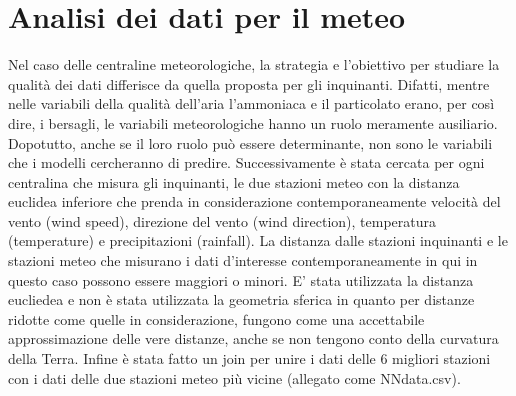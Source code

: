 \documentclass{article}
\begin{document}
\section{Analisi dei dati per il meteo}
Nel caso delle centraline meteorologiche, la strategia e l’obiettivo per studiare la qualità dei dati differisce da quella proposta 
per gli inquinanti. 
Difatti, mentre nelle variabili della qualità dell’aria l’ammoniaca e il particolato erano, 
per così dire, i bersagli, le variabili meteorologiche hanno un ruolo meramente ausiliario. 
Dopotutto, anche se il loro ruolo può essere determinante, non sono le variabili che i modelli cercheranno di predire. 
Successivamente è stata cercata per ogni centralina che misura gli inquinanti, le due  
stazioni meteo con la distanza euclidea inferiore che prenda in considerazione contemporaneamente velocità del vento 
(wind speed), direzione del vento (wind direction), temperatura (temperature) e precipitazioni (rainfall).
La distanza dalle stazioni inquinanti e le stazioni meteo che misurano i dati d'interesse contemporaneamente in qui in questo caso possono 
essere maggiori o minori. 
E' stata utilizzata la distanza eucliedea e non è stata utilizzata la geometria sferica in quanto per distanze ridotte come quelle in considerazione, 
fungono come una accettabile approssimazione delle vere distanze, anche se non tengono conto della curvatura della Terra.
Infine è stata fatto un join per unire i dati delle 6 migliori stazioni con i dati delle due
stazioni meteo più vicine (allegato come NNdata.csv). 
\end{document}
